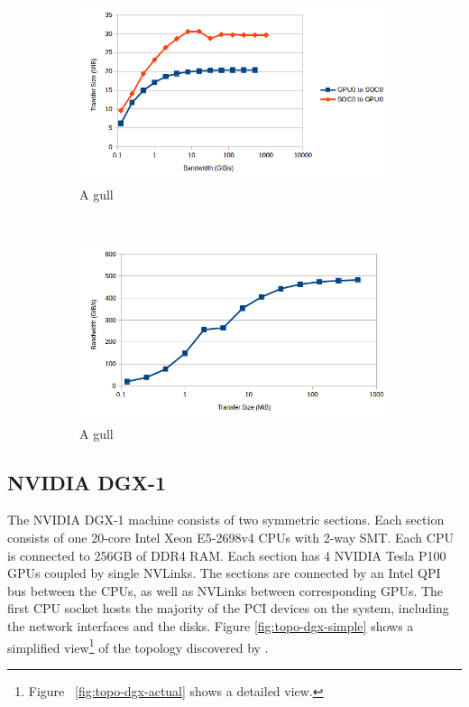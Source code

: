 \begin{figure}[ht]
    \centering
    \begin{subfigure}[b]{0.3\textwidth}
        \includegraphics[width=\textwidth]{figures/minsky-soc0-gpu0.png}
        \caption{A gull}
        \label{fig:gull}
    \end{subfigure}
    ~
    \begin{subfigure}[b]{0.3\textwidth}
        \includegraphics[width=\textwidth]{figures/minsky-gpu0-gpu0.png}
        \caption{A gull}
        \label{fig:gull}
    \end{subfigure}

    \caption[]{}
    \label{fig:minksy}
\end{figure}

\subsection{NVIDIA DGX-1}
\label{sec:topology-dgx1}

The NVIDIA DGX-1 machine consists of two symmetric sections.
Each section consists of one 20-core Intel Xeon E5-2698v4 CPUs with 2-way SMT.
Each CPU is connected to 256GB of DDR4 RAM.
Each section has 4 NVIDIA Tesla P100 GPUs coupled by single NVLinks.
The sections are connected by an Intel QPI bus between the CPUs, as well as NVLinks between corresponding GPUs.
The first CPU socket hosts the majority of the PCI devices on the system, including the network interfaces and the disks.
Figure \ref{fig:topo-dgx-simple} shows a simplified view\footnote{Figure ~\ref{fig:topo-dgx-actual} shows a detailed view.} of the topology discovered by .


